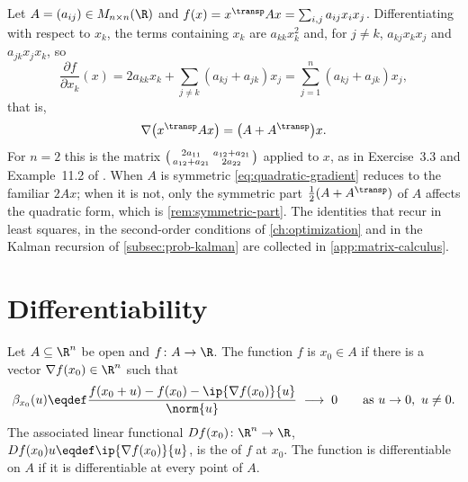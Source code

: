 \begin{eg}\label{eg:quadratic-gradient}
	Let $A=(a_{ij})\in M_{n\times n}(\R)$ and $f(x)=x^{\transp}Ax
		=\sum_{i,j}a_{ij}x_ix_j$. Differentiating with respect to $x_k$, the terms
	containing $x_k$ are $a_{kk}x_k^2$ and, for $j\neq k$, $a_{kj}x_kx_j$ and
	$a_{jk}x_jx_k$, so
	\[
		\frac{\partial f}{\partial x_k}(x)=2a_{kk}x_k+\sum_{j\neq k}(a_{kj}+a_{jk})x_j
		=\sum_{j=1}^{n}(a_{kj}+a_{jk})x_j ,
	\]
	that is,
	\begin{equation}\label{eq:quadratic-gradient}
		\nabla\bigl(x^{\transp}Ax\bigr)=\bigl(A+A^{\transp}\bigr)x .
	\end{equation}
	For $n=2$ this is the matrix
	$\begin{psmallmatrix}2a_{11}&a_{12}+a_{21}\\a_{12}+a_{21}&2a_{22}\end{psmallmatrix}$
	applied to $x$, as in Exercise~3.3 and Example~11.2 of
	\textcite{fukuda2026notes} \autocite[slide 49]{fukuda2026calculus}. When $A$ is
	symmetric \eqref{eq:quadratic-gradient} reduces to the familiar $2Ax$; when it is
	not, only the symmetric part $\tfrac12(A+A^{\transp})$ of $A$ affects the
	quadratic form, which is \autoref{rem:symmetric-part}. The identities that
	recur in least squares, in the second-order conditions of
	\autoref{ch:optimization} and in the Kalman recursion of
	\autoref{subsec:prob-kalman} are collected in \autoref{app:matrix-calculus}.
\end{eg}

\section{Differentiability}\label{sec:cn-differentiability}

\begin{definition}\label{def:total-derivative}
	Let $A\subseteq\R^n$ be open and $f\colon A\to\R$. The function $f$ is
	 $x_0\in A$ if
	there is a vector $\nabla f(x_0)\in\R^n$ such that
	\begin{equation}\label{eq:frechet}
		\beta_{x_0}(u)\eqdef
		\frac{f(x_0+u)-f(x_0)-\ip{\nabla f(x_0)}{u}}{\norm{u}}
		\;\longrightarrow\;0
		\qquad\text{as }u\to0,\ u\neq0 .
	\end{equation}
	The associated linear functional $Df(x_0)\colon\R^n\to\R$,
	$Df(x_0)u\eqdef\ip{\nabla f(x_0)}{u}$, is the  of $f$ at
	$x_0$. The function is differentiable on $A$ if it is differentiable at every
	point of $A$.
\end{definition}

